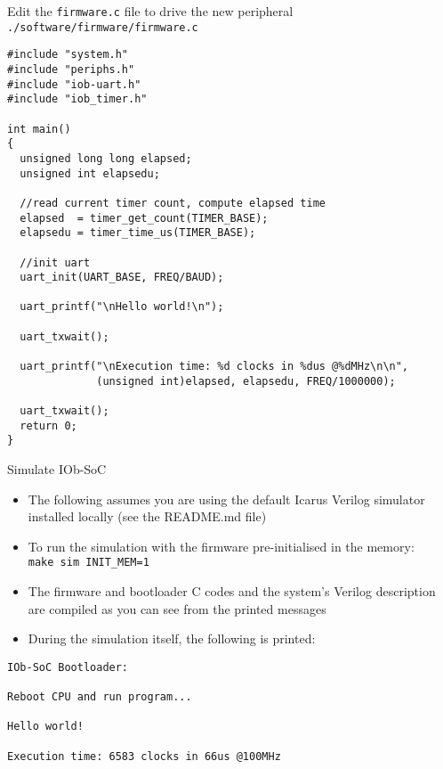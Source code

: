 \documentclass [xcolor=svgnames, t] {beamer}
\begin{document}
\begin{frame}[fragile]{Edit the {\tt firmware.c} file to drive the new peripheral}
  {\tt ./software/firmware/firmware.c}
  \begin{tiny}
    \begin{lstlisting}
#include "system.h"
#include "periphs.h"
#include "iob-uart.h"
#include "iob_timer.h"

int main()
{
  unsigned long long elapsed;
  unsigned int elapsedu;

  //read current timer count, compute elapsed time
  elapsed  = timer_get_count(TIMER_BASE);
  elapsedu = timer_time_us(TIMER_BASE);

  //init uart 
  uart_init(UART_BASE, FREQ/BAUD);

  uart_printf("\nHello world!\n");
  
  uart_txwait();

  uart_printf("\nExecution time: %d clocks in %dus @%dMHz\n\n", 
              (unsigned int)elapsed, elapsedu, FREQ/1000000);

  uart_txwait();
  return 0;
}
\end{lstlisting}
\end{tiny}
\end{frame}


\begin{frame}[fragile]{Simulate IOb-SoC}
\begin{itemize}
\item The following assumes you are using the default Icarus Verilog simulator
  installed locally (see the README.md file)
\item To run the simulation with the firmware pre-initialised in the memory:\\
  {\tt make sim INIT\_MEM=1}
\item The firmware and bootloader C codes and the system's Verilog description are compiled as you can see from the printed messages
\item During the simulation itself, the following is printed:
\end{itemize}

\begin{tiny}
  \begin{lstlisting}
IOb-SoC Bootloader:

Reboot CPU and run program...

Hello world!

Execution time: 6583 clocks in 66us @100MHz

  \end{lstlisting}
\end{tiny}
\end{frame}
\end{document}
